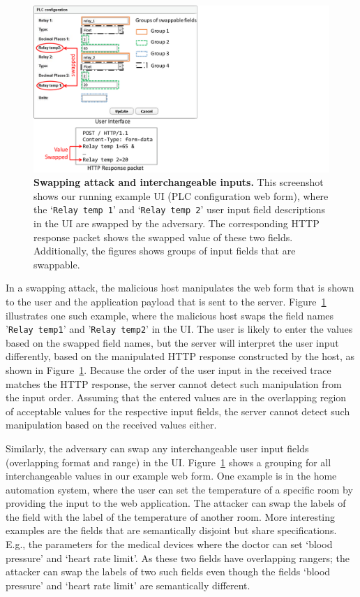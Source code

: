 \begin{figure}[t]
  \centering

     \includegraphics[trim={0 -1cm 14cm 0},clip, width=0.65\linewidth]{chapters/IntegriKey/images/SwapExample.pdf}
    \caption[Swapping attack and interchangeable inputs]{\textbf{Swapping attack and interchangeable inputs.} This screenshot shows our running example UI (PLC configuration web form), where the `\texttt{Relay temp 1}' and `\texttt{Relay temp 2}' user input field descriptions in the UI are swapped by the adversary. The corresponding HTTP response packet shows the swapped value of these two fields. Additionally, the figures shows groups of input fields that are swappable.} 
    \label{fig:swapExample} 
\end{figure}


In a swapping attack, the malicious host manipulates the web form that is shown to the user and the application payload that is sent to the server. Figure~\ref{fig:swapExample} illustrates one such example, where the malicious host swaps the field names '\texttt{Relay temp1}' and '\texttt{Relay temp2}' in the UI. The user is likely to enter the values based on the swapped field names, but the server will interpret the user input differently, based on the manipulated HTTP response constructed by the host, as shown in Figure~\ref{fig:swapExample}. Because the order of the user input in the received trace matches the HTTP response, the server cannot detect such manipulation from the input order. Assuming that the entered values are in the overlapping region of acceptable values for the respective input fields, the server cannot detect such manipulation based on the received values either. 

Similarly, the adversary can swap any interchangeable user input fields (overlapping format and range) in the UI. Figure~\ref{fig:swapExample} shows a grouping for all interchangeable values in our example web form. One example is in the home automation system, where the user can set the temperature of a specific room by providing the input to the web application. The attacker can swap the labels of the field with the label of the temperature of another room. More interesting examples are the fields that are semantically disjoint but share specifications. E.g., the parameters for the medical devices where the doctor can set `blood pressure' and `heart rate limit'. As these two fields have overlapping rangers; the attacker can swap the labels of two such fields even though the fields `blood pressure' and `heart rate limit' are semantically different. 

